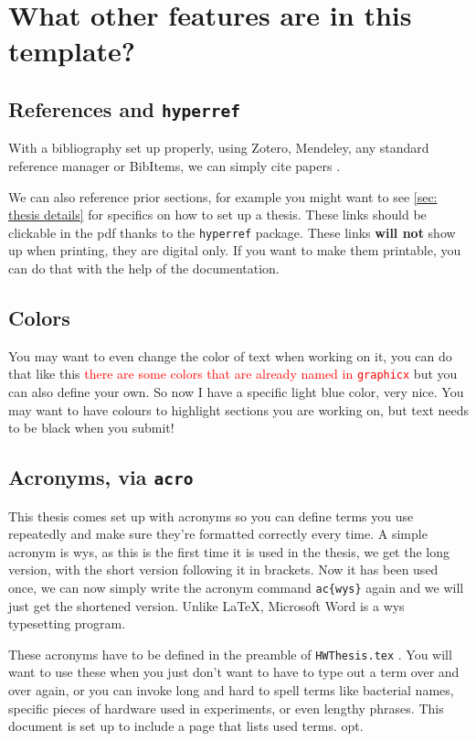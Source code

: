 \documentclass[../HWThesis.tex]{subfiles} %
\begin{document}
\section{What other features are in this template?}

\subsection{References and \texttt{hyperref}}
With a bibliography set up properly, using Zotero, Mendeley, any standard reference manager or BibItems, we can simply cite papers \cite{ghc-pps}. 

We can also reference prior sections, for example you might want to see \ref{sec: thesis details} for specifics on how to set up a thesis. These links should be clickable in the pdf thanks to the \texttt{hyperref} package. These links \textbf{will not} show up when printing, they are digital only. If you want to make them printable, you can do that with the help of the documentation. 

\subsection{Colors}
You may want to even change the color of text when working on it, you can do that like this \textcolor{red}{there are some colors that are already named in \texttt{graphicx}} but you can also define your own.   \textcolor{light-blue}{So now I have a specific light blue color, very nice.} You may want to have colours to highlight sections you are working on, but text needs to be black when you submit!


\subsection{Acronyms, via \texttt{acro}}

This thesis comes set up with acronyms so you can define terms you use repeatedly and make sure they're formatted correctly every time. A simple acronym is  \ac{wys}, as this is the first time it is used in the thesis, we get the long version, with the short version following it in brackets. Now it has been used once, we can now simply write the acronym command \texttt{ac\{wys\}} again and we will just get the shortened version. Unlike \LaTeX, Microsoft Word is a \ac{wys} typesetting program. 

These acronyms have to be defined in the preamble of \texttt{HWThesis.tex} . You will want to use these when you just don't want to have to type out a term over and over again, or you can invoke long and hard to spell terms like bacterial names, specific pieces of hardware used in experiments, or even lengthy phrases. This document is set up to include a page that lists used terms. \acl{opt}. 
\end{document}
